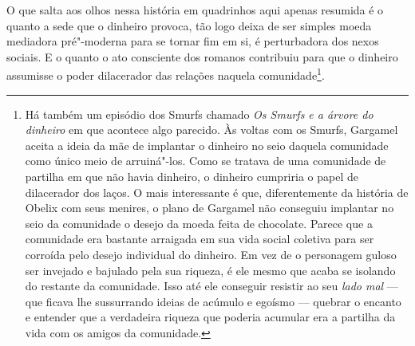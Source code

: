 O que salta aos olhos nessa história em quadrinhos aqui apenas resumida
é o quanto a sede que o dinheiro provoca, tão logo deixa de ser simples
moeda mediadora pré"-moderna para se tornar fim em si, é perturbadora dos
nexos sociais. E o quanto o ato consciente dos romanos contribuiu para
que o dinheiro assumisse o poder dilacerador das relações naquela
comunidade\footnote{Há também um episódio dos Smurfs chamado \emph{Os
  Smurfs e a árvore do dinheiro} em que acontece algo parecido. Às
  voltas com os Smurfs, Gargamel aceita a ideia da mãe de implantar o
  dinheiro no seio daquela comunidade como único meio de arruiná"-los.
  Como se tratava de uma comunidade de partilha em que não havia
  dinheiro, o dinheiro cumpriria o papel de dilacerador dos laços. O
  mais interessante é que, diferentemente da história de Obelix com seus
  menires, o plano de Gargamel não conseguiu implantar no seio da
  comunidade o desejo da moeda feita de chocolate. Parece que a
  comunidade era bastante arraigada em sua vida social coletiva para ser
  corroída pelo desejo individual do dinheiro. Em vez de o personagem
  guloso ser invejado e bajulado pela sua riqueza, é ele mesmo que acaba
  se isolando do restante da comunidade. Isso até ele conseguir resistir
  ao seu \emph{lado mal} --- que ficava lhe sussurrando ideias de acúmulo
  e egoísmo --- quebrar o encanto e entender que a verdadeira riqueza que
  poderia acumular era a partilha da vida com os amigos da comunidade.}.


